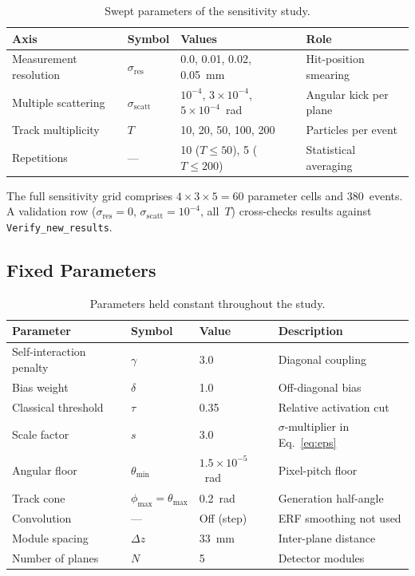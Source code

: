 \documentclass[11pt,a4paper]{article}
\newcommand{\sres}{\sigma_{\mathrm{res}}}
\newcommand{\sscat}{\sigma_{\mathrm{scatt}}}
\newcommand{\thmin}{\theta_{\min}}
\newcommand{\Dz}{\Delta z}
\newcommand{\ntrk}{T}
\newcommand{\codepath}[1]{\texttt{#1}}
\begin{document}
\begin{table}[H]
  \centering
  \caption{Swept parameters of the sensitivity study.}
  \label{tab:grid}
  \begin{tabular}{llp{6cm}l}
    \toprule
    Axis & Symbol & Values & Role \\
    \midrule
    Measurement resolution & $\sres$ &
      0.0, 0.01, 0.02, 0.05~mm &
      Hit-position smearing \\
    Multiple scattering & $\sscat$ &
      $10^{-4}$, $3\!\times\!10^{-4}$, $5\!\times\!10^{-4}$~rad &
      Angular kick per plane \\
    Track multiplicity & $\ntrk$ &
      10, 20, 50, 100, 200 &
      Particles per event \\
    Repetitions & --- &
      10 ($\ntrk\leq50$), 5 ($\ntrk\leq200$) &
      Statistical averaging \\
    \bottomrule
  \end{tabular}
\end{table}

The full sensitivity grid comprises $4\times3\times5=60$ parameter cells and 380~events.
A validation row ($\sres=0$, $\sscat=10^{-4}$, all~$\ntrk$) cross-checks results
against \codepath{Verify\_new\_results}.

\subsection{Fixed Parameters}

\begin{table}[H]
  \centering
  \caption{Parameters held constant throughout the study.}
  \label{tab:fixed}
  \begin{tabular}{llll}
    \toprule
    Parameter & Symbol & Value & Description \\
    \midrule
    Self-interaction penalty & $\gamma$ & 3.0 & Diagonal coupling \\
    Bias weight & $\delta$ & 1.0 & Off-diagonal bias \\
    Classical threshold & $\tau$ & 0.35 & Relative activation cut \\
    Scale factor & $s$ & 3.0 & $\sigma$-multiplier in Eq.~\eqref{eq:eps} \\
    Angular floor & $\thmin$ & $1.5\times10^{-5}$~rad & Pixel-pitch floor \\
    Track cone & $\phi_{\max}=\theta_{\max}$ & 0.2~rad & Generation half-angle \\
    Convolution & --- & Off (step) & ERF smoothing not used \\
    Module spacing & $\Dz$ & 33~mm & Inter-plane distance \\
    Number of planes & $N$ & 5 & Detector modules \\
    \bottomrule
  \end{tabular}
\end{table}
\end{document}
